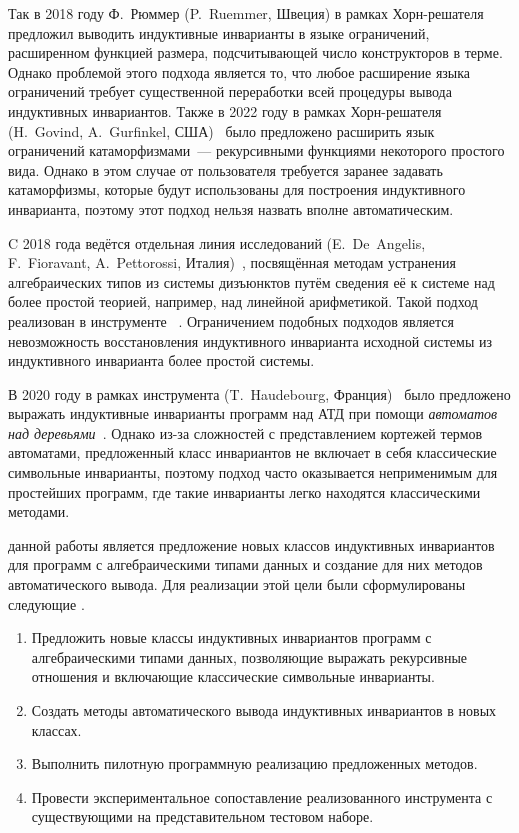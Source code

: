Так в 2018 году Ф.~Рюммер (P.~Ruemmer, Швеция) в рамках Хорн-решателя \eldarica{}~\cite{8603013} предложил выводить индуктивные инварианты в языке ограничений, расширенном функцией размера, подсчитывающей число конструкторов в терме. Однако проблемой этого  подхода является то, что любое расширение языка ограничений требует существенной переработки всей процедуры вывода индуктивных инвариантов.
Также в 2022 году в рамках Хорн-решателя \racer{} (H.~Govind, A.~Gurfinkel, США)~\cite{10.1145/3498722} было предложено расширить язык ограничений катаморфизмами~--- рекурсивными функциями некоторого простого вида. Однако в этом случае от пользователя требуется заранее задавать катаморфизмы, которые будут использованы для построения индуктивного инварианта, поэтому этот подход нельзя назвать вполне автоматическим.

C 2018 года ведётся отдельная линия исследований (E.~De~Angelis, F.~Fioravant, A.~Pettorossi, Италия)~\cite{10.1093/logcom/exab090,pettorossi_proietti_2022,10.1007/978-3-030-51074-9_6,angelis_fioravanti_pettorossi_proietti_2018}, посвящённая  методам устранения алгебраических типов из системы дизъюнктов путём сведения её к системе над более простой теорией, например, над линейной арифметикой. Такой подход реализован в  инструменте \vericat{}~\cite{de_angelis_proietti_fioravanti_pettorossi_2022}. Ограничением подобных подходов является невозможность восстановления индуктивного инварианта исходной системы из индуктивного инварианта более простой системы.

В 2020 году в рамках инструмента \rchc{} (T.~Haudebourg, Франция)~\cite{haude2020} было предложено выражать индуктивные инварианты программ над АТД при помощи \emph{автоматов над деревьями}~\cite{tata}. Однако из-за сложностей с представлением кортежей термов автоматами, предложенный класс инвариантов не включает в себя классические символьные инварианты, поэтому подход часто оказывается неприменимым для простейших программ, где такие инварианты легко находятся классическими методами.

{\aim} данной работы является предложение новых классов индуктивных инвариантов для программ с алгебраическими типами данных и создание для них методов автоматического вывода.
Для  реализации этой цели были сформулированы следующие {\tasks}.
\begin{enumerate}[beginpenalty=10000] %
  \item Предложить новые классы индуктивных инвариантов программ с алгебраическими типами данных, позволяющие выражать рекурсивные отношения и включающие классические символьные инварианты.
  \item Создать методы автоматического вывода индуктивных инвариантов в новых классах.
  \item Выполнить пилотную программную реализацию предложенных методов.
  \item Провести экспериментальное сопоставление реализованного инструмента с существующими на представительном  тестовом наборе.
\end{enumerate}


